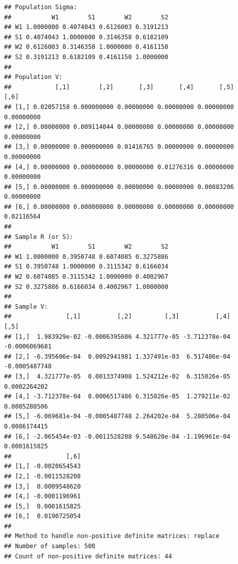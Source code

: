 \documentclass[]{article}
\newenvironment{Shaded}{\begin{snugshade}}{\end{snugshade}}
\newcommand{\KeywordTok}[1]{\textcolor[rgb]{0.13,0.29,0.53}{\textbf{#1}}}
\newcommand{\DataTypeTok}[1]{\textcolor[rgb]{0.13,0.29,0.53}{#1}}
\newcommand{\StringTok}[1]{\textcolor[rgb]{0.31,0.60,0.02}{#1}}
\newcommand{\OperatorTok}[1]{\textcolor[rgb]{0.81,0.36,0.00}{\textbf{#1}}}
\newcommand{\NormalTok}[1]{#1}
\begin{document}
\begin{verbatim}
## Population Sigma:
##           W1        S1        W2        S2
## W1 1.0000000 0.4074043 0.6126003 0.3191213
## S1 0.4074043 1.0000000 0.3146358 0.6182109
## W2 0.6126003 0.3146358 1.0000000 0.4161150
## S2 0.3191213 0.6182109 0.4161150 1.0000000
## 
## Population V:
##            [,1]        [,2]       [,3]       [,4]       [,5]       [,6]
## [1,] 0.02057158 0.000000000 0.00000000 0.00000000 0.00000000 0.00000000
## [2,] 0.00000000 0.009114044 0.00000000 0.00000000 0.00000000 0.00000000
## [3,] 0.00000000 0.000000000 0.01416765 0.00000000 0.00000000 0.00000000
## [4,] 0.00000000 0.000000000 0.00000000 0.01276316 0.00000000 0.00000000
## [5,] 0.00000000 0.000000000 0.00000000 0.00000000 0.00883206 0.00000000
## [6,] 0.00000000 0.000000000 0.00000000 0.00000000 0.00000000 0.02116564
## 
## Sample R (or S):
##           W1        S1        W2        S2
## W1 1.0000000 0.3950748 0.6074085 0.3275886
## S1 0.3950748 1.0000000 0.3115342 0.6166034
## W2 0.6074085 0.3115342 1.0000000 0.4002967
## S2 0.3275886 0.6166034 0.4002967 1.0000000
## 
## Sample V:
##               [,1]          [,2]         [,3]          [,4]          [,5]
## [1,]  1.983929e-02 -0.0006395606 4.321777e-05 -3.712378e-04 -0.0006069681
## [2,] -6.395606e-04  0.0092941981 1.337491e-03  6.517486e-04 -0.0005487748
## [3,]  4.321777e-05  0.0013374908 1.524212e-02  6.315026e-05  0.0002264202
## [4,] -3.712378e-04  0.0006517486 6.315026e-05  1.279211e-02  0.0005280506
## [5,] -6.069681e-04 -0.0005487748 2.264202e-04  5.280506e-04  0.0086174415
## [6,] -2.065454e-03 -0.0011528208 9.548620e-04 -1.196961e-04  0.0001615825
##               [,6]
## [1,] -0.0020654543
## [2,] -0.0011528208
## [3,]  0.0009548620
## [4,] -0.0001196961
## [5,]  0.0001615825
## [6,]  0.0190725054
## 
## Method to handle non-positive definite matrices: replace
## Number of samples: 500
## Count of non-positive definite matrices: 44
\end{verbatim}

\begin{Shaded}
\end{Shaded}
\end{document}
